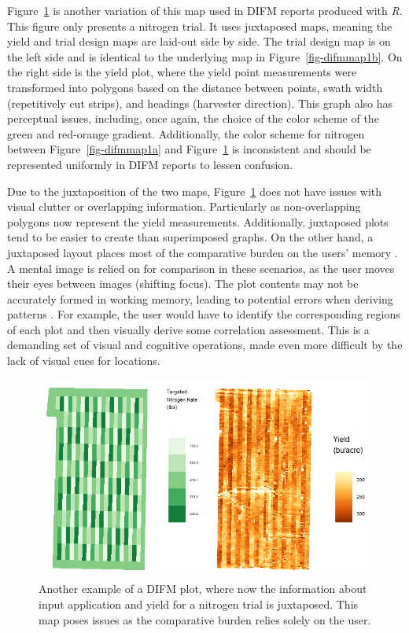 \documentclass[
  authoryear,
  preprint,
  3p]{elsarticle}
\begin{document}
Figure~\ref{fig-jux-plot} is another variation of this map used in DIFM
reports produced with \emph{R}. This figure only presents a nitrogen
trial. It uses juxtaposed maps, meaning the yield and trial design maps
are laid-out side by side. The trial design map is on the left side and
is identical to the underlying map in Figure~\ref{fig-difmmap1b}. On the
right side is the yield plot, where the yield point measurements were
transformed into polygons based on the distance between points, swath
width (repetitively cut strips), and headings (harvester direction).
This graph also has perceptual issues, including, once again, the choice
of the color scheme of the green and red-orange gradient. Additionally,
the color scheme for nitrogen between Figure~\ref{fig-difmmap1a} and
Figure~\ref{fig-jux-plot} is inconsistent and should be represented
uniformly in DIFM reports to lessen confusion.

Due to the juxtaposition of the two maps, Figure~\ref{fig-jux-plot} does
not have issues with visual clutter or overlapping information.
Particularly as non-overlapping polygons now represent the yield
measurements. Additionally, juxtaposed plots tend to be easier to create
than superimposed graphs. On the other hand, a juxtaposed layout places
most of the comparative burden on the users' memory
\citep{gleicher2011}. A mental image is relied on for comparison in
these scenarios, as the user moves their eyes between images (shifting
focus). The plot contents may not be accurately formed in working
memory, leading to potential errors when deriving patterns
\citep{vanderplas2020, lyi2021}. For example, the user would have to
identify the corresponding regions of each plot and then visually derive
some correlation assessment. This is a demanding set of visual and
cognitive operations, made even more difficult by the lack of visual
cues for locations.

\begin{figure}

{\centering \includegraphics{../images/juxtaposed-ex.jpeg}

}

\caption{\label{fig-jux-plot}Another example of a DIFM plot, where now
the information about input application and yield for a nitrogen trial
is juxtaposed. This map poses issues as the comparative burden relies
solely on the user.}

\end{figure}
\end{document}
